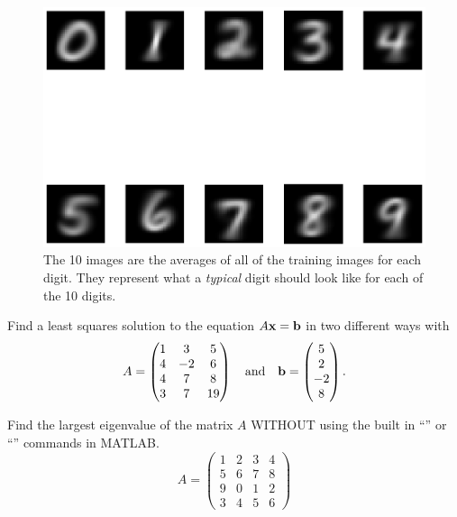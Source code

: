 \begin{figure}
    \begin{center}
        \includegraphics[width=0.9\columnwidth]{mnist_average_training_image.eps}
    \end{center}
    \caption{The 10 images are the averages of all of the training images for each digit.
        They represent what a {\it typical} digit should look like for each of the 10
    digits.}
    \label{fig:mnist_average}
\end{figure}



\begin{problem}
    Find a least squares solution to the equation $A {\bf x} = {\bf b}$ in two different ways with 
    \[ A = \begin{pmatrix} 1 & 3 & 5 \\ 4 & -2 & 6 \\ 4 & 7 & 8 \\ 3 & 7 & 19
        \end{pmatrix} \quad \text{and} \quad {\bf b} = \begin{pmatrix} 5 \\ 2 \\ -2 \\
        8\end{pmatrix}. \]
\end{problem}

\begin{problem}
    Find the largest eigenvalue of the matrix $A$ WITHOUT using the built in
    ``'' or ``'' commands in MATLAB.
    \[ A = \begin{pmatrix} 1 & 2 & 3 & 4 \\ 5 & 6 & 7 & 8 \\ 9 & 0 & 1 & 2 \\ 3 & 4 & 5 &
        6 \end{pmatrix} \]
\end{problem}



